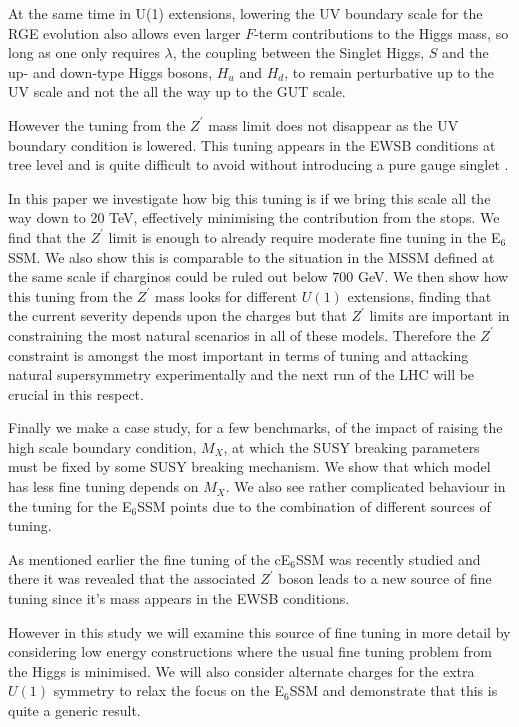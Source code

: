 \documentclass[preprint,amsmath,amssymb,aps,superscriptaddress,prd,showpacs,floatfix,nofootinbib]{revtex4-1}
\begin{document}
At the same time in U(1) extensions, lowering the UV boundary scale
for the RGE evolution also allows even larger $F$-term contributions
to the Higgs mass, so long as one only requires $\lambda$, the
coupling between the Singlet Higgs, $S$ and the up- and down-type
Higgs bosons, $H_u$ and $H_d$, to remain perturbative up to the UV
scale and not the all the way up to the GUT scale.

However the tuning from the $Z^\prime$ mass limit does not disappear
as the UV boundary condition is lowered. This tuning appears in the
EWSB conditions at tree level and is quite difficult to avoid without
introducing a pure gauge singlet \cite{Athron:2014pua}.



In this paper we investigate how big this tuning is if we bring this
scale all the way down to 20 TeV, effectively minimising the contribution
from the stops. We find that the $Z^\prime$ limit is enough to already
require moderate fine tuning in the E$_6$SSM.  We also show this is
comparable to the situation in the MSSM defined at the same scale if
charginos could be ruled out below $700$ GeV.  We then show how this
tuning from the $Z^\prime$ mass looks for different $U(1)$ extensions,
finding that the current severity depends upon the charges but that
$Z^\prime$ limits are important in constraining the most natural
scenarios in all of these models.  Therefore the $Z^\prime$ constraint
is amongst the most important in terms of tuning and attacking natural
supersymmetry experimentally and the next run of the LHC will be
crucial in this respect.


Finally we make a case study, for a few benchmarks, of the impact of
raising the high scale boundary condition, $M_X$, at which the SUSY
breaking parameters must be fixed by some SUSY breaking mechanism. We
show that which model has less fine tuning depends on $M_X$.  We also
see rather complicated behaviour in the tuning for the E$_6$SSM points
due to the combination of different sources of tuning.



As mentioned earlier the fine tuning of the cE$_6$SSM was recently studied
\cite{Athron:2013ipa} and there it was revealed that the associated
$Z^\prime$ boson leads to a new source of fine tuning since it's mass
appears in the EWSB conditions.  

However in this study we will examine this source of fine tuning in more
detail by considering low energy constructions where the usual fine
tuning problem from the Higgs is minimised.  We will also consider
alternate charges for the extra $U(1)$ symmetry to relax the focus on
the E$_6$SSM and demonstrate that this is quite a generic result.
\end{document}

